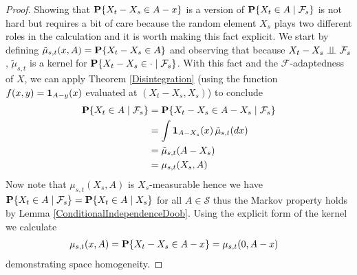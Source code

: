 \begin{proof}
Showing that $\probability{X_t - X_s \in A - x}$ is a version of
$\cprobability{\mathcal{F}_s}{X_t \in A}$ is not hard but requires a
bit of care because the random element $X_s$ plays two different roles
in the calculation and it is worth making this fact explicit.
We start by defining 
$\tilde{\mu}_{s,t}(x, A) = \probability{X_t - X_s \in A}$ and observing
that because $\cindependent{X_t - X_s}{\mathcal{F}_s}{}$,
$\tilde{\mu}_{s,t}$ is a kernel for $\cprobability{\mathcal{F}_s}{X_t
  - X_s \in \cdot}$.  With this fact and the $\mathcal{F}$-adaptedness
of $X$, we can apply Theorem
\ref{Disintegration} (using the function $f(x,y) =
\characteristic{A-y}(x)$ evaluated at $(X_t - X_s, X_s)$) to conclude
\begin{align*}
\cprobability{\mathcal{F}_s}{X_t \in A} &= 
\cprobability{\mathcal{F}_s}{X_t - X_s \in A - X_s} \\
&=\int \characteristic{A - X_s}(x) \, \tilde{\mu}_{s,t}(dx) \\
&=\tilde{\mu}_{s,t}(A - X_s) \\
&=\mu_{s,t}(X_s, A)
\end{align*}
Now note that $\mu_{s,t}(X_s, A)$ is $X_s$-measurable hence we have
$\cprobability{\mathcal{F}_s}{X_t \in A} = \cprobability{X_s}{X_t
  \in A} $ for all $A \in \mathcal{S}$ thus the Markov property
holds by Lemma \ref{ConditionalIndependenceDoob}.  
Using the explicit form of the kernel we calculate
\begin{align*}
\mu_{s,t}(x, A) &=  \probability{X_t - X_s \in A-x} = \mu_{s,t}(0, A-x) 
\end{align*}
demonstrating space homogeneity.
\end{proof}

